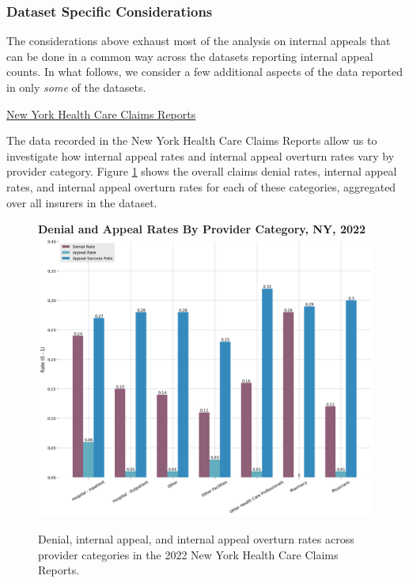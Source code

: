 \documentclass[12pt, a4paper,twoside]{report}
\theoremstyle{plain} %
\theoremstyle{definition} %
\theoremstyle{remark} %
\numberwithin{equation}{chapter}
\begin{document}
		\clearpage
		
		\subsubsection{Dataset Specific Considerations}
		
		The considerations above exhaust most of the analysis on internal appeals that can be done in a common way across the datasets reporting internal appeal counts. In what follows, we consider a few additional aspects of the data reported in only \emph{some} of the datasets.
		
		\underline{New York Health Care Claims Reports}
		
		The data recorded in the New York Health Care Claims Reports allow us to investigate how internal appeal rates and internal appeal overturn rates vary by provider category. Figure \ref{nyappealratesbyprovidercat} shows the overall claims denial rates, internal appeal rates, and internal appeal overturn rates for each of these categories, aggregated over all insurers in the dataset.
		
		\begin{figure}[h!]
			\centering
			\textbf{Denial and Appeal Rates By Provider Category, NY, 2022}
			\includegraphics[width=\columnwidth]{images/ny_claim_reports/denial_and_appeal_rates_by_provider_cat.png}
			\caption{Denial, internal appeal, and internal appeal overturn rates across provider categories in the 2022 New York Health Care Claims Reports.}
			\label{nyappealratesbyprovidercat}
		\end{figure}
	
\end{document}
